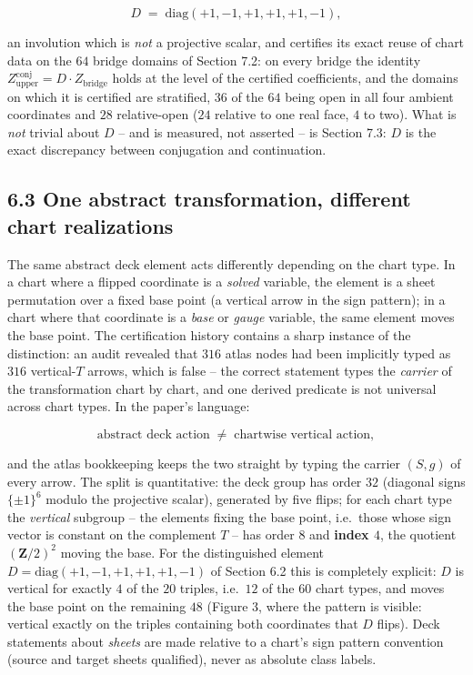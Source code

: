 \[D \;=\; \mathrm{diag}(+1, -1, +1, +1, +1, -1),\]

an involution which is \emph{not} a projective scalar, and certifies its exact reuse of chart data on the \(64\) bridge domains of Section 7.2: on every bridge the identity \(Z^{\mathrm{conj}}_{\mathrm{upper}} = D \cdot
Z_{\mathrm{bridge}}\) holds at the level of the certified coefficients, and the domains on which it is certified are stratified, \(36\) of the \(64\) being open in all four ambient coordinates and \(28\) relative-open (\(24\) relative to one real face, \(4\) to two). What is \emph{not} trivial about \(D\) -- and is measured, not asserted -- is Section 7.3: \(D\) is the exact discrepancy between conjugation and continuation.

\subsection{6.3 One abstract transformation, different chart realizations}\label{one-abstract-transformation-different-chart-realizations}

The same abstract deck element acts differently depending on the chart type. In a chart where a flipped coordinate is a \emph{solved} variable, the element is a sheet permutation over a fixed base point (a vertical arrow in the sign pattern); in a chart where that coordinate is a \emph{base} or \emph{gauge} variable, the same element moves the base point. The certification history contains a sharp instance of the distinction: an audit revealed that \(316\) atlas nodes had been implicitly typed as \(316\) vertical-\(T\) arrows, which is false -- the correct statement types the \emph{carrier} of the transformation chart by chart, and one derived predicate is not universal across chart types. In the paper's language:

\[\text{abstract deck action} \;\neq\; \text{chartwise vertical action},\]

and the atlas bookkeeping keeps the two straight by typing the carrier \((S, g)\) of every arrow. The split is quantitative: the deck group has order \(32\) (diagonal signs \(\{\pm 1\}^6\) modulo the projective scalar), generated by five flips; for each chart type the \emph{vertical} subgroup -- the elements fixing the base point, i.e.~those whose sign vector is constant on the complement \(T\) -- has order \(8\) and \textbf{index \(4\)}, the quotient \((\mathbf{Z}/2)^2\) moving the base. For the distinguished element \(D = \mathrm{diag}(+1,-1,+1,+1,+1,-1)\) of Section 6.2 this is completely explicit: \(D\) is vertical for exactly \(4\) of the \(20\) triples, i.e.~\(12\) of the \(60\) chart types, and moves the base point on the remaining \(48\) (Figure 3, where the pattern is visible: vertical exactly on the triples containing both coordinates that \(D\) flips). Deck statements about \emph{sheets} are made relative to a chart's sign pattern convention (source and target sheets qualified), never as absolute class labels.

